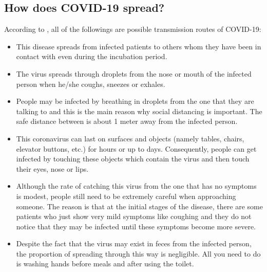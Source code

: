     \subsection{How does COVID-19 spread?}
      \par According to \textcite{Q&A_WHO}, all of the followings are possible transmission routes of COVID-19:
      \begin{itemize}
        \item This disease spreads from infected patients to others whom they have been in contact with even during the incubation period.
        \item The virus spreads through droplets from the nose or mouth of the infected person when he/she coughs, sneezes or exhales.
        \item People may be infected by breathing in droplets from the one that they are talking to and this is the main reason why social distancing is important. The safe distance between is about 1 meter away from the infected person.
        \item This coronavirus can last on surfaces and objects (namely tables, chairs, elevator buttons, etc.) for hours or up to days. Consequently, people can get infected by touching these objects which contain the virus and then touch their eyes, nose or lips.
        \item Although the rate of catching this virus from the one that has no symptoms is modest, people still need to be extremely careful when approaching someone. The reason is that at the initial stages of the disease, there are some patients who just show very mild symptoms like coughing and they do not notice that they may be infected until these symptoms become more severe.
        \item Despite the fact that the virus may exist in feces from the infected person, the proportion of spreading through this way is negligible. All you need to do is washing hands before meals and after using the toilet.
      \end{itemize}

